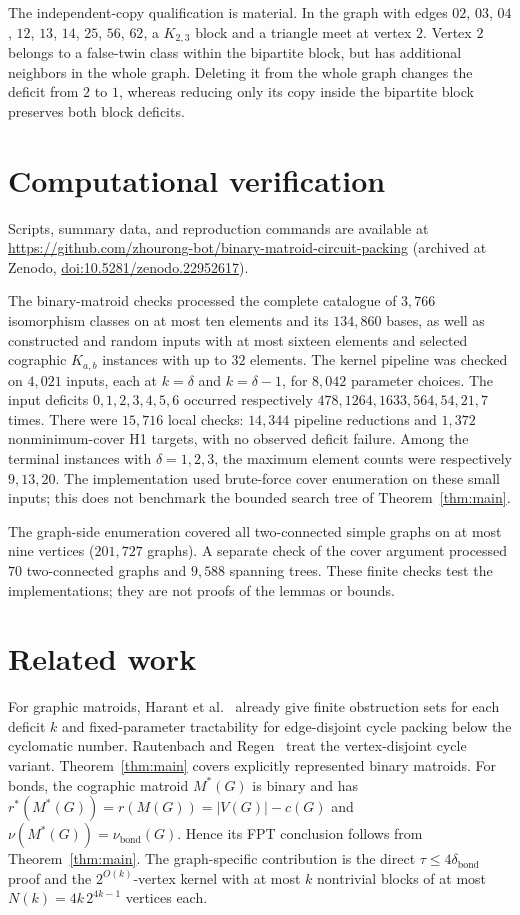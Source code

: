 \documentclass[11pt]{article}
\newcommand{\bond}{\operatorname{bond}}
\begin{document}
The independent-copy qualification is material.  In the graph with
edges $02$, $03$, $04$, $12$, $13$, $14$, $25$, $56$, $62$, a $K_{2,3}$ block and a
triangle meet at vertex $2$.  Vertex $2$ belongs to a false-twin
class within the bipartite block, but has additional neighbors in the
whole graph.  Deleting it from the whole graph changes the deficit
from $2$ to $1$, whereas reducing only its copy inside the bipartite
block preserves both block deficits.

\section{Computational verification}\label{sec:comp}
{\sloppy Scripts, summary data, and reproduction commands are available at
\url{https://github.com/zhourong-bot/binary-matroid-circuit-packing}
(archived at Zenodo, \href{https://doi.org/10.5281/zenodo.22952617}{doi:10.5281/zenodo.22952617}).\par}
The binary-matroid checks processed the complete catalogue of $3,766$
isomorphism classes on at most ten elements and its $134,860$ bases,
as well as constructed and random inputs with at most sixteen elements
and selected cographic $K_{a,b}$ instances with up to $32$ elements.
The kernel pipeline was checked on $4,021$ inputs, each at
$k=\delta$ and $k=\delta-1$, for $8,042$ parameter choices.  The
input deficits $0,1,2,3,4,5,6$ occurred respectively $478,1264,1633,
564,54,21,7$ times.  There were $15,716$ local checks: $14,344$
pipeline reductions and $1,372$ nonminimum-cover H1 targets, with no
observed deficit failure.  Among the terminal instances with
$\delta=1,2,3$, the maximum element counts were respectively
$9,13,20$.  The implementation used brute-force cover enumeration on
these small inputs; this does not benchmark the bounded search tree
of Theorem~\ref{thm:main}.

The graph-side enumeration covered all two-connected simple graphs on
at most nine vertices ($201,727$ graphs).  A separate check of the
cover argument processed $70$ two-connected graphs and $9,588$
spanning trees.  These finite checks test the implementations; they
are not proofs of the lemmas or bounds.

\section{Related work}\label{sec:related}
For graphic matroids, Harant et al.~\citep{Harant2010} already give
finite obstruction sets for each deficit $k$ and fixed-parameter
tractability for edge-disjoint cycle packing below the cyclomatic
number.  Rautenbach and Regen~\citep{RautenbachRegen2012} treat the
vertex-disjoint cycle variant.  Theorem~\ref{thm:main} covers
explicitly represented binary matroids.  For bonds, the cographic
matroid $M^*(G)$ is binary and has
$r^*(M^*(G))=r(M(G))=|V(G)|-c(G)$ and
$\nu(M^*(G))=\nu_{\bond}(G)$.  Hence its FPT conclusion follows
from Theorem~\ref{thm:main}.  The graph-specific contribution is the
direct $\tau\leq4\delta_{\bond}$ proof and the $2^{O(k)}$-vertex
kernel with at most $k$ nontrivial blocks of at most
$N(k)=4k\,2^{4k-1}$ vertices each.
\end{document}
